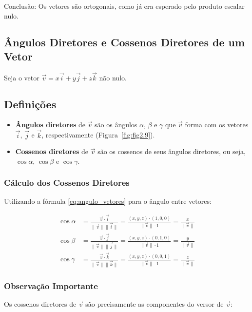 Conclusão: Os vetores são ortogonais, como já era esperado pelo produto escalar
nulo.

\subsection{Ângulos Diretores e Cossenos Diretores de um Vetor}

Seja o vetor $\vec{v} = x\vec{i} + y\vec{j} + z\vec{k}$ não nulo.

\subsection*{Definições}
\begin{itemize}
    \item \textbf{Ângulos diretores} de $\vec{v}$ são os ângulos $\alpha$,
    $\beta$ e $\gamma$ que $\vec{v}$ forma com os vetores $\vec{i}$, $\vec{j}$ e
    $\vec{k}$, respectivamente (Figura~\ref{fig:fig2.9}).
    
    \item \textbf{Cossenos diretores} de $\vec{v}$ são os cossenos de seus
    ângulos diretores, ou seja, $\cos\alpha$, $\cos\beta$ e $\cos\gamma$.
\end{itemize}

\subsubsection*{Cálculo dos Cossenos Diretores}
Utilizando a fórmula \eqref{eq:angulo_vetores} para o ângulo entre vetores:

\begin{align}
  \cos\alpha &= \frac{\vec{v} \cdot \vec{i}}{\|\vec{v}\|\|\vec{i}\|} = \frac{(x,y,z) \cdot (1,0,0)}{\|\vec{v}\| \cdot 1} = \frac{x}{\|\vec{v}\|} \\
  \cos\beta &= \frac{\vec{v} \cdot \vec{j}}{\|\vec{v}\|\|\vec{j}\|} = \frac{(x,y,z) \cdot (0,1,0)}{\|\vec{v}\| \cdot 1} = \frac{y}{\|\vec{v}\|} \\
  \cos\gamma &= \frac{\vec{v} \cdot \vec{k}}{\|\vec{v}\|\|\vec{k}\|} = \frac{(x,y,z) \cdot (0,0,1)}{\|\vec{v}\| \cdot 1} = \frac{z}{\|\vec{v}\|}
\end{align}

\subsubsection*{Observação Importante}
Os cossenos diretores de $\vec{v}$ são precisamente as componentes do versor de
$\vec{v}$:


